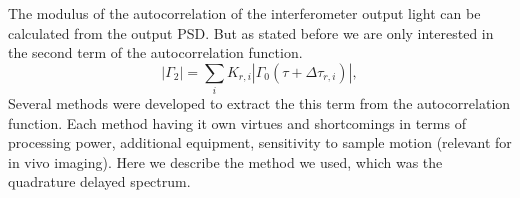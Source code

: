 \documentclass[12pt,twoside,english]{book}
\renewcommand{\~}{\perispomeni}%
\numberwithin{equation}{section}
\numberwithin{figure}{section}
\begin{document}
The modulus of the autocorrelation of the interferometer output light can be calculated from the output \gls{PSD}. But as stated before we are only interested in the second term of the autocorrelation function.
\begin{equation} \left|\Gamma_{2}\right|=\sum_{i}K_{r,i}\left|\Gamma_{0}\left(\tau+\Delta\tau_{r,i}\right)\right|,\end{equation}
Several methods were developed to extract the this term from the autocorrelation function. Each method having it own virtues and shortcomings in terms of processing power, additional equipment, sensitivity to sample motion (relevant for in vivo imaging). Here we describe the method we used, which was the quadrature delayed spectrum.

%
%
\end{document}
